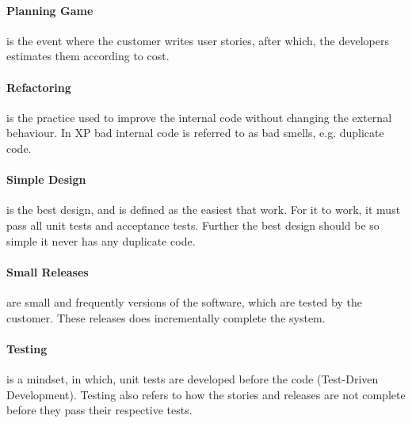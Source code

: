 \paragraph{Planning Game} is the event where the customer writes user stories, after which, the developers estimates them according to cost.

\paragraph{Refactoring} is the practice used to improve the internal code without changing the external behaviour.
In XP bad internal code is referred to as bad smells, e.g. duplicate code.


\paragraph{Simple Design} is the best design, and is defined as the easiest that work.
For it to work, it must pass all unit tests and acceptance tests.
Further the best design should be so simple it never has any duplicate code.


\paragraph{Small Releases} are small and frequently versions of the software, which are tested by the customer.
These releases does incrementally complete the system.

\paragraph{Testing} is a mindset, in which, unit tests are developed before the code (Test-Driven Development).
Testing also refers to how the stories and releases are not complete before they pass their respective tests.

